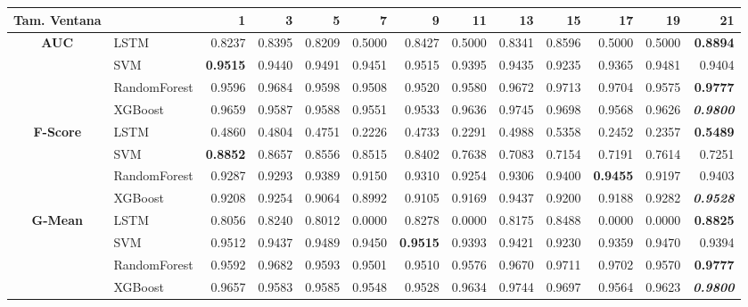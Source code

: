 \begin{table}[H]
	\centering
	\begin{adjustbox}{max width=14cm}
		\begin{tabular}{|c|l|r|r|r|r|r|r|r|r|r|r|r|}
			\hline
			\textbf{Tam. Ventana}&         &      1  &      3  &      5  &      7  &      9  &      11 &      13 &      15 &      17 &      19 &      21 \\
			\hline
			\textbf{AUC} &  LSTM &  0.8237 &  0.8395 &  0.8209 &  0.5000 &  0.8427 &  0.5000 &  0.8341 &  0.8596 &  0.5000 &  0.5000 & \textbf{  0.8894 } \\
			&  SVM & \textbf{  0.9515 } &  0.9440 &  0.9491 &  0.9451 &  0.9515 &  0.9395 &  0.9435 &  0.9235 &  0.9365 &  0.9481 &  0.9404 \\
			&  RandomForest &  0.9596 &  0.9684 &  0.9598 &  0.9508 &  0.9520 &  0.9580 &  0.9672 &  0.9713 &  0.9704 &  0.9575 & \textbf{  0.9777 } \\
			&  XGBoost &  0.9659 &  0.9587 &  0.9588 &  0.9551 &  0.9533 &  0.9636 &  0.9745 &  0.9698 &  0.9568 &  0.9626 & \textit{ \textbf{  0.9800 } } \\
			\hline
			\textbf{F-Score} &  LSTM &  0.4860 &  0.4804 &  0.4751 &  0.2226 &  0.4733 &  0.2291 &  0.4988 &  0.5358 &  0.2452 &  0.2357 & \textbf{  0.5489 } \\
			&  SVM & \textbf{  0.8852 } &  0.8657 &  0.8556 &  0.8515 &  0.8402 &  0.7638 &  0.7083 &  0.7154 &  0.7191 &  0.7614 &  0.7251 \\
			&  RandomForest &  0.9287 &  0.9293 &  0.9389 &  0.9150 &  0.9310 &  0.9254 &  0.9306 &  0.9400 & \textbf{  0.9455 } &  0.9197 &  0.9403 \\
			&  XGBoost &  0.9208 &  0.9254 &  0.9064 &  0.8992 &  0.9105 &  0.9169 &  0.9437 &  0.9200 &  0.9188 &  0.9282 & \textit{ \textbf{  0.9528 } } \\
			\hline
			\textbf{G-Mean} &  LSTM &  0.8056 &  0.8240 &  0.8012 &  0.0000 &  0.8278 &  0.0000 &  0.8175 &  0.8488 &  0.0000 &  0.0000 & \textbf{  0.8825 } \\
			&  SVM &  0.9512 &  0.9437 &  0.9489 &  0.9450 & \textbf{  0.9515 } &  0.9393 &  0.9421 &  0.9230 &  0.9359 &  0.9470 &  0.9394 \\
			&  RandomForest &  0.9592 &  0.9682 &  0.9593 &  0.9501 &  0.9510 &  0.9576 &  0.9670 &  0.9711 &  0.9702 &  0.9570 & \textbf{  0.9777 } \\
			&  XGBoost &  0.9657 &  0.9583 &  0.9585 &  0.9548 &  0.9528 &  0.9634 &  0.9744 &  0.9697 &  0.9564 &  0.9623 & \textit{ \textbf{  0.9800 } } \\

\end{tabular}
\end{adjustbox}
\end{table}
